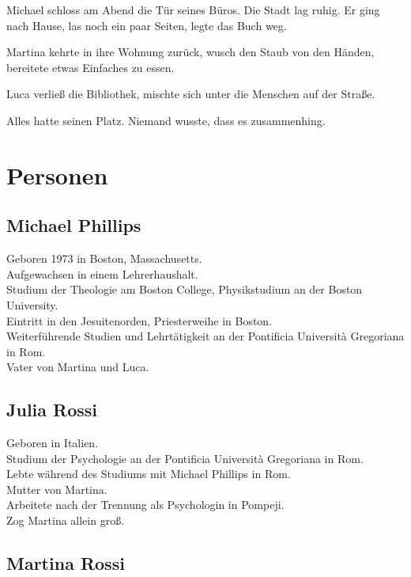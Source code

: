 \documentclass[
]{article}
\begin{document}
Michael schloss am Abend die Tür seines Büros. Die Stadt lag ruhig. Er ging nach Hause, las noch ein paar Seiten, legte das Buch weg.

Martina kehrte in ihre Wohnung zurück, wusch den Staub von den Händen, bereitete etwas Einfaches zu essen.

Luca verließ die Bibliothek, mischte sich unter die Menschen auf der Straße.

Alles hatte seinen Platz. Niemand wusste, dass es zusammenhing.

\section{Personen}\label{personen}

\subsection{Michael Phillips}\label{michael-phillips}

Geboren 1973 in Boston, Massachusetts.\\
Aufgewachsen in einem Lehrerhaushalt.\\
Studium der Theologie am Boston College, Physikstudium an der Boston University.\\
Eintritt in den Jesuitenorden, Priesterweihe in Boston.\\
Weiterführende Studien und Lehrtätigkeit an der Pontificia Università Gregoriana in Rom.\\
Vater von Martina und Luca.

\subsection{Julia Rossi}\label{julia-rossi}

Geboren in Italien.\\
Studium der Psychologie an der Pontificia Università Gregoriana in Rom.\\
Lebte während des Studiums mit Michael Phillips in Rom.\\
Mutter von Martina.\\
Arbeitete nach der Trennung als Psychologin in Pompeji.\\
Zog Martina allein groß.

\subsection{Martina Rossi}\label{martina-rossi}
\end{document}
